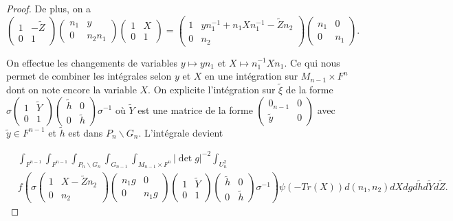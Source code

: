 \documentclass{amsart}
\begin{document}
\begin{proof}
De plus, on a
\begin{equation}
\begin{pmatrix}
1 & -\tilde{Z} \\
0 & 1
\end{pmatrix}  \begin{pmatrix}
n_1 & y \\
0 & n_2n_1
\end{pmatrix} \begin{pmatrix}
1 & X \\
0 & 1
\end{pmatrix} = \begin{pmatrix}
1 & yn_1^{-1} + n_1Xn_1^{-1} - \tilde{Z}n_2\\
0 & n_2
\end{pmatrix}\begin{pmatrix}
n_1 & 0\\
0 & n_1
\end{pmatrix}.
\end{equation}

On effectue les changements de variables $y \mapsto yn_1$ et $X \mapsto n_1^{-1}Xn_1$. Ce qui nous permet de combiner les intégrales selon $y$ et $X$ en une intégration sur $M_{n-1} \times F^n$ dont on note encore la variable $X$. On explicite l'intégration sur $\tilde{\xi}$ de la forme $\sigma \begin{pmatrix}
1 & \tilde{Y} \\
0 & 1
\end{pmatrix}\begin{pmatrix}
\tilde{h} & 0 \\
0 & \tilde{h}
\end{pmatrix} \sigma^{-1}$
où $\tilde{Y}$ est une matrice de la forme $\begin{pmatrix}
0_{n-1} & 0 \\
\tilde{y} & 0
\end{pmatrix}$ avec $\tilde{y} \in F^{n-1}$ et $\tilde{h}$ est dans $P_n \backslash{G_n}$. L'intégrale devient

\begin{equation}
\begin{split}
&\int_{F^{n-1}} \int_{F^{n-1}} \int_{P_n \backslash{G_n}} \int_{G_{n-1}} \int_{M_{n-1} \times F^n}  |\det g|^{-2}\int_{U_n^2} \\
& f\left(\sigma \begin{pmatrix}
1 & X - \tilde{Z}n_2 \\
0 & n_2
\end{pmatrix} \begin{pmatrix}
n_1g & 0 \\
0 & n_1g
\end{pmatrix} \begin{pmatrix}
1 & \tilde{Y} \\
0 & 1
\end{pmatrix}\begin{pmatrix}
\tilde{h} & 0 \\
0 & \tilde{h}
\end{pmatrix} \sigma^{-1} \right)  \psi(-Tr(X))  d(n_1,n_2) dX dg d\tilde{h} d\tilde{Y} d\tilde{Z}.
\end{split}
\end{equation}


\end{proof}
\end{document}
